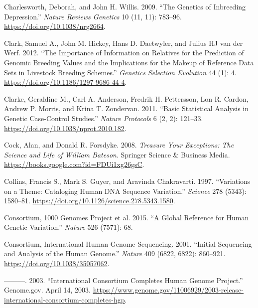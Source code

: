 \documentclass[
]{book}
\newlength{\cslhangindent}
\newlength{\cslentryspacingunit} %
\newenvironment{CSLReferences}[2] %
 {%
  \setlength{\parindent}{0pt}
  \ifodd #1
  \let\oldpar\par
  \def\par{\hangindent=\cslhangindent\oldpar}
  \fi
  \setlength{\parskip}{#2\cslentryspacingunit}
 }%
 {}
\begin{document}
\begin{CSLReferences}{1}{0}
\leavevmode{}%
Charlesworth, Deborah, and John H. Willis. 2009. {``The Genetics of Inbreeding Depression.''} \emph{Nature Reviews Genetics} 10 (11, 11): 783--96. \url{https://doi.org/10.1038/nrg2664}.

\leavevmode{}%
Clark, Samuel A., John M. Hickey, Hans D. Daetwyler, and Julius HJ van der Werf. 2012. {``The Importance of Information on Relatives for the Prediction of Genomic Breeding Values and the Implications for the Makeup of Reference Data Sets in Livestock Breeding Schemes.''} \emph{Genetics Selection Evolution} 44 (1): 4. \url{https://doi.org/10.1186/1297-9686-44-4}.

\leavevmode{}%
Clarke, Geraldine M., Carl A. Anderson, Fredrik H. Pettersson, Lon R. Cardon, Andrew P. Morris, and Krina T. Zondervan. 2011. {``Basic Statistical Analysis in Genetic Case-Control Studies.''} \emph{Nature Protocols} 6 (2, 2): 121--33. \url{https://doi.org/10.1038/nprot.2010.182}.

\leavevmode{}%
Cock, Alan, and Donald R. Forsdyke. 2008. \emph{Treasure {Your Exceptions}: {The Science} and {Life} of {William Bateson}}. {Springer Science \& Business Media}. \url{https://books.google.com?id=FDUi1xg26gsC}.

\leavevmode{}%
Collins, Francis S., Mark S. Guyer, and Aravinda Chakravarti. 1997. {``Variations on a {Theme}: {Cataloging Human DNA Sequence Variation}.''} \emph{Science} 278 (5343): 1580--81. \url{https://doi.org/10.1126/science.278.5343.1580}.

\leavevmode{}%
Consortium, 1000 Genomes Project et al. 2015. {``A Global Reference for Human Genetic Variation.''} \emph{Nature} 526 (7571): 68.

\leavevmode{}%
Consortium, International Human Genome Sequencing. 2001. {``Initial Sequencing and Analysis of the Human Genome.''} \emph{Nature} 409 (6822, 6822): 860--921. \url{https://doi.org/10.1038/35057062}.

\leavevmode{}%
---------. 2003. {``International {Consortium Completes Human Genome Project}.''} {Genome.gov}. April 14, 2003. \url{https://www.genome.gov/11006929/2003-release-international-consortium-completes-hgp}.


\end{CSLReferences}
\end{document}
